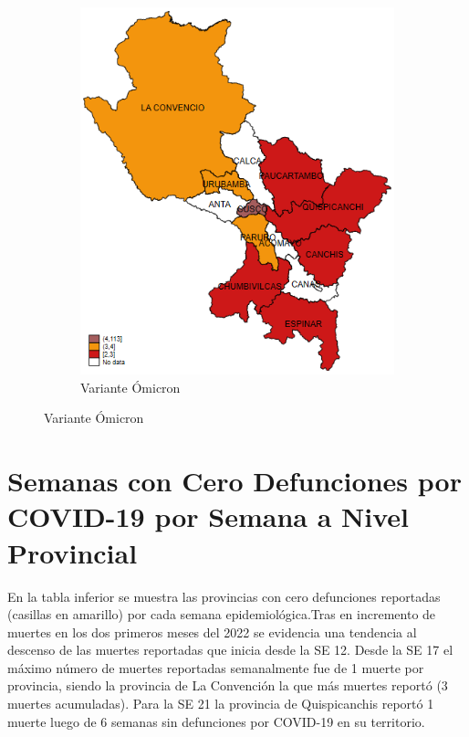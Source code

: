 \documentclass[12pt,a4paper,openany]{book}
\begin{document}
\begin{figure}[h]
\begin{subfigure}[b]{0.40\textwidth}
			\includegraphics[width=\textwidth]{../figuras/variantes_provincial_omicron.png}
			\caption{Variante Ómicron}
		\end{subfigure}
	\end{figure}
	
	\clearpage
	
	
	
	\clearpage
	\section*{Semanas con Cero Defunciones por COVID-19 por Semana a Nivel Provincial}
	
	\noindent En la tabla inferior se muestra las provincias con cero defunciones reportadas (casillas en amarillo) por cada semana epidemiológica.Tras en incremento de muertes en los dos primeros meses del 2022 se evidencia una tendencia al descenso de las muertes reportadas que inicia desde la SE 12. Desde la SE 17 el máximo número de muertes reportadas semanalmente fue de 1 muerte por provincia, siendo la provincia de La Convención la que más muertes reportó (3 muertes acumuladas). Para la SE 21 la provincia de Quispicanchis reportó 1 muerte luego de 6 semanas sin defunciones por COVID-19 en su territorio. 
	
\end{document}
